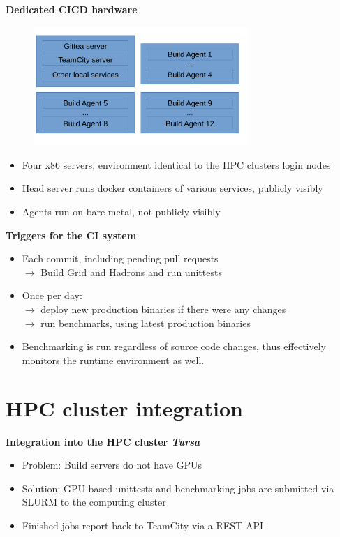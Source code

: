 \documentclass[english,xcolor=pst,11pt]{beamer}
\begin{document}
\begin{frame}
\textbf{Dedicated CICD hardware}
 \begin{figure}[H]
	\centering
    {\includegraphics[width=3.2in]{diagrams/hardware.pdf}}
\end{figure}

\begin{itemize}
 \item Four x86 servers, environment identical to the HPC clusters login nodes
 \item Head server runs docker containers of various services, publicly visibly
 \item Agents run on bare metal, not publicly visibly
\end{itemize}

\end{frame}

\begin{frame}
 \textbf{Triggers for the CI system}
\begin{itemize}
 \item Each commit, including pending pull requests \\$\longrightarrow$ Build Grid and Hadrons and run unittests
 \item Once per day: \\$\longrightarrow$ deploy new production binaries if there were any changes \\
 $\longrightarrow$ run benchmarks, using latest production binaries
 \item Benchmarking is run regardless of source code changes, thus effectively monitors the runtime environment as well.
\end{itemize}
\end{frame}

\section{HPC cluster integration}
\begin{frame}
 \textbf{Integration into the HPC cluster \emph{Tursa}}
 \begin{itemize}
  \item Problem: Build servers do not have GPUs
  \item Solution: GPU-based unittests and benchmarking jobs are submitted via SLURM to the computing cluster
  \item Finished jobs report back to TeamCity via a REST API
 \end{itemize}

\end{frame}
\end{document}
